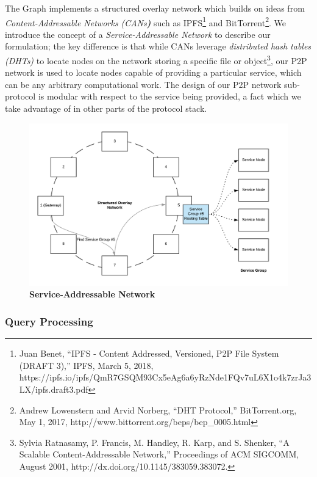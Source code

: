 \documentclass[12pt]{article}
\begin{document}
The Graph implements a structured overlay network which builds on ideas from
\textit{Content-Addressable Networks (CANs}\textbf{\textit{)}} such as
IPFS\footnote{Juan Benet, ``IPFS - Content Addressed, Versioned, P2P File System
  (DRAFT 3),'' IPFS, March 5, 2018,
  https://ipfs.io/ipfs/QmR7GSQM93Cx5eAg6a6yRzNde1FQv7uL6X1o4k7zrJa3LX/ipfs.draft3.pdf}
and BitTorrent\footnote{Andrew Lowenstern and Arvid Norberg, ``DHT Protocol,''
  BitTorrent.org, May 1, 2017, http://www.bittorrent.org/beps/bep\_0005.html}.
We introduce the concept of a \textit{Service-Addressable Network} to describe
our formulation; the key difference is that while CANs leverage
\textit{distributed hash tables (DHTs)} to locate nodes on the network storing a
specific file or object\footnote{Sylvia Ratnasamy, P. Francis, M. Handley, R.
  Karp, and S. Shenker, ``A Scalable Content-Addressable Network,'' Proceedings
  of ACM SIGCOMM, August 2001, http://dx.doi.org/10.1145/383059.383072. }, our
P2P network is used to locate nodes capable of providing a particular service,
which can be any arbitrary computational work. The design of our P2P network
sub-protocol is modular with respect to the service being provided, a fact which
we take advantage of in other parts of the protocol stack.

\begin{figure}[H]
  \vspace*{5mm}
  \caption{\textbf{Service-Addressable Network}}
  \begin{center}
    \includegraphics[width=1\textwidth]{media/image6.png}
  \end{center}
\end{figure}

\subsubsection*{Query Processing}
\end{document}
